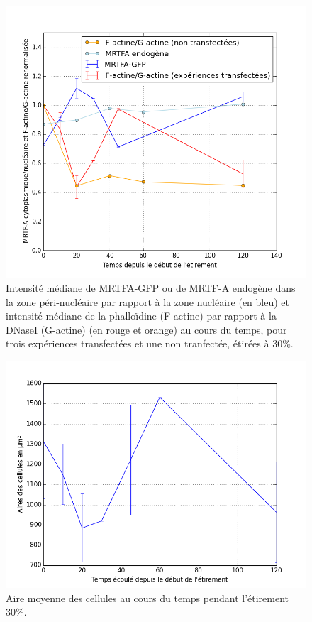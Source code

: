 \begin{figure}
\includegraphics[scale=0.5]{Figures/Et30_MRTFA_FG.png} 
\caption{\label{Et30_MRTFA_FG} Intensité médiane de MRTFA-GFP ou de MRTF-A endogène dans la zone péri-nucléaire par rapport à la zone nucléaire (en bleu) et intensité médiane de la phalloïdine (F-actine) par rapport à la DNaseI (G-actine) (en rouge et orange)  au cours du temps, pour trois expériences transfectées et une non tranfectée, étirées à 30\%.  }
\end{figure}
\begin{figure}
\includegraphics[scale=0.5]{Figures/Et30_Aires.png} 
\caption{\label{Et30_Aires} Aire moyenne des cellules au cours du temps pendant l'étirement 30\%. }
\end{figure}
